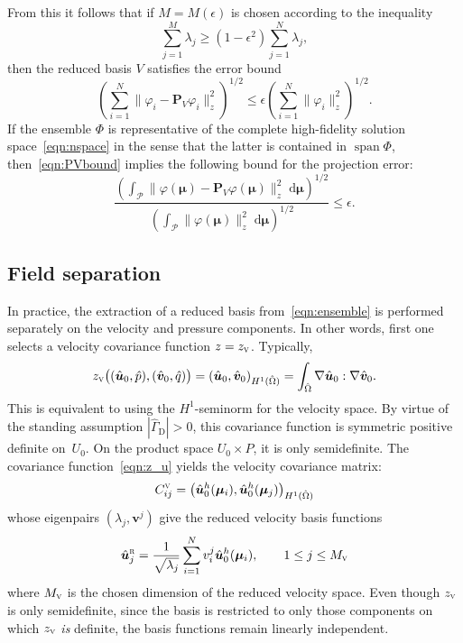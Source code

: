 \documentclass[onecolumn, twoside, a4paper, 11pt]{article}
\newcommand{\dd}{{\;\mathrm{d}}}
\begin{document}
From this it follows that if $M = M(\epsilon)$ is chosen according to the inequality
\begin{equation}
  \label{eqn:error}
  \sum_{j=1}^M \lambda_j
  \geq \left(1 - \epsilon^2\right) \sum_{j=1}^N \lambda_j,
\end{equation}
%
then the reduced basis $V$ satisfies the error bound
%
\begin{equation}
\label{eqn:PVbound}
\left( \sum_{i=1}^N \big\| \varphi_i - \bm P_V \varphi_i \big\|_z^2 \right)^{1/2}
  \leq \epsilon \left( \sum_{i=1}^N \big\| \varphi_i \big\|_z^2 \right)^{1/2}.
\end{equation}
%
If the ensemble $\Phi$ is representative of the complete high-fidelity solution space~\eqref{eqn:nspace}
in the sense that the latter is contained in $\operatorname{span}\Phi$, then~\eqref{eqn:PVbound}
implies the following bound for the projection error:
%
\begin{equation}
\label{eqn:RBerror}
\frac{\left( \int_\mathcal{P}\big\|\varphi(\bm \mu) - \bm P_V \varphi(\bm \mu)\big\|_z^2\dd\bm \mu \right)^{1/2}}
{\left( \int_\mathcal{P} \big\| \varphi(\bm \mu) \big\|_z^2 \dd\bm \mu \right)^{1/2}}
  \leq \epsilon
  .
\end{equation}
%


\subsection{Field separation}
\label{sec:fieldsep}
In practice, the extraction of a reduced basis from~\eqref{eqn:ensemble} is performed separately
on the velocity and pressure components. In other words, first one selects a velocity covariance
function $z=z_\textsc{v}$. Typically,
%
\begin{equation}
\label{eqn:z_u}
z_\textsc{v}\big((\hat{\bm u}_0, \hat{p}), (\hat{\bm v}_0, \hat{q})\big) =
  \left( \hat{\bm u}_0, \hat{\bm v}_0 \right)_{H^1(\hat{\Omega})}
  = \int_{\hat{\Omega}} \nabla \hat{\bm u}_0 : \nabla \hat{\bm v}_0.
\end{equation}
%
This is equivalent to using the $H^1$-seminorm for the velocity space. By virtue of the standing
assumption $|\hat{\Gamma}_\text{D}| > 0$, this covariance function is
symmetric positive definite on~$U_0$. On the product space $U_0 \times P$, it is only semidefinite.
The covariance function~\eqref{eqn:z_u} yields the velocity covariance matrix:
%
\begin{equation}
  C^{\textsc{v}}_{ij} = \left( \hat{\bm u}^h_0(\bm{\mu}_i), \hat{\bm u}^h_0(\bm{\mu}_j) \right)_{H^1(\hat{\Omega})}
\end{equation}
%
whose eigenpairs $(\lambda_j, \bm v^{j})$ give the reduced velocity
basis functions
%
\begin{equation}
\label{eqn:uRj}
  \hat{\bm u}^\textsc{r}_j = \frac{1}{\sqrt{\lambda_j}} \sum_{i=1}^N v^{j}_i \hat{\bm u}^h_0(\bm{\mu}_i),
  \qquad 1 \leq j \leq M_\textsc{v}
\end{equation}
%
where $M_\textsc{v}$ is the chosen dimension of the reduced velocity space. Even though
$z_\textsc{v}$ is only semidefinite, since the basis is restricted to only those
components on which $z_\textsc{v}$ \emph{is} definite, the basis functions remain
linearly independent.
\end{document}
